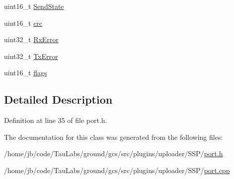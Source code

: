 \begin{DoxyCompactItemize}
\item 
uint16\-\_\-t \hyperlink{group___uploader_ga9eaf6bf50865d1b4f8470110523b9f6b}{\-Send\-State}
\item 
uint16\-\_\-t \hyperlink{group___uploader_ga6ad77d0d0cc02d7ce86e13041ef33c5e}{crc}
\item 
uint32\-\_\-t \hyperlink{group___uploader_ga6d92cd4c24b14264e16528a599123db4}{\-Rx\-Error}
\item 
uint32\-\_\-t \hyperlink{group___uploader_ga9b23351e935a17b3a216b903dabac29c}{\-Tx\-Error}
\item 
uint16\-\_\-t \hyperlink{group___uploader_gae9ceccbaac142c00a4699e9020d27f4b}{flags}
\end{DoxyCompactItemize}


\subsection{\-Detailed \-Description}


\-Definition at line 35 of file port.\-h.



\-The documentation for this class was generated from the following files\-:\begin{DoxyCompactItemize}
\item 
/home/jb/code/\-Tau\-Labs/ground/gcs/src/plugins/uploader/\-S\-S\-P/\hyperlink{port_8h}{port.\-h}\item 
/home/jb/code/\-Tau\-Labs/ground/gcs/src/plugins/uploader/\-S\-S\-P/\hyperlink{port_8cpp}{port.\-cpp}\end{DoxyCompactItemize}
